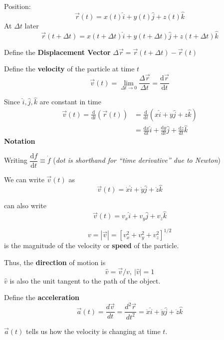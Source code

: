 \documentclass[10pt]{scrartcl}
\begin{document}
\setlength{\jot}{8pt}%

Position: 
\[\vec{r}(t) = x(t)\hat{i} + y(t)\hat{j} + z(t)\hat{k}\]
At $\Delta t$ later
\[\vec{r}(t + \Delta t) = x(t + \Delta t)\hat{i} + y(t + \Delta t)\hat{j} + z(t + \Delta t)\hat{k}\]

\begin{definition}
Define the \textbf{Displacement Vector} $\Delta \vec{r} = \vec{r}(t + \Delta t) - \vec{r}(t)$

\end{definition}
\begin{definition}
Define the \textbf{velocity} of the particle at time $t$
\[\vec{v}(t) = \lim_{\Delta t \to 0} \frac{\Delta \vec{r}}{\Delta t} = \frac{\mathrm{d}\vec{r}}{\mathrm{d}t}\]
\end{definition}

Since $\hat{i},\hat{j},\hat{k}$ are constant in time
\[\begin{aligned}
	\vec{v}(t) = \frac{\mathrm{d}}{\mathrm{d}t}(\vec{r}(t)) &= \frac{\mathrm{d}}{\mathrm{d}t}(x \hat{i} + y\hat{j} + z\hat{k})\\
	&= \frac{\mathrm{d}x}{\mathrm{d}t}\hat{i} + \frac{\mathrm{d}y}{\mathrm{d}t}\hat{j} + \frac{\mathrm{d}z}{\mathrm{d}t}\hat{k}
\end{aligned}
\]
\textbf{Notation}

Writing $\dfrac{\mathrm{d}f}{\mathrm{d}t} \equiv \dot{f}$ (\emph{dot is shorthand for ``time derivative'' due to Newton})

We can write $\vec{v}(t)$ as \[\vec{v}(t) = \dot{x}\hat{i} + \dot{y}\hat{j} + \dot{z}\hat{k}\]

can also write \[\vec{v}(t) = v_x\hat{i} + v_y\hat{j} + v_z\hat{k}\]

\begin{definition}
\[v = |\vec{v}| = [v_x^2 + v_y^2 + v_z^2]^{1/2}\]
is the magnitude of the velocity or \textbf{speed} of the particle.

Thus, the \textbf{direction} of motion is 
\[\hat{v} = \vec{v}/v,~ |\hat{v}| = 1\]
$\hat{v}$ is also the unit tangent to the path of the object.
\end{definition}

\begin{definition}
Define the \textbf{acceleration}
\[\vec{a}(t) = \frac{d\vec{v}}{dt} = \frac{d^2\vec{r}}{dt^2} = \ddot{x}\hat{i} + \ddot{y}\hat{j} + \ddot{z}\hat{k}\]
\end{definition}

$\vec{a}(t)$ tells us how the velocity is changing at time $t$. 
\end{document}

